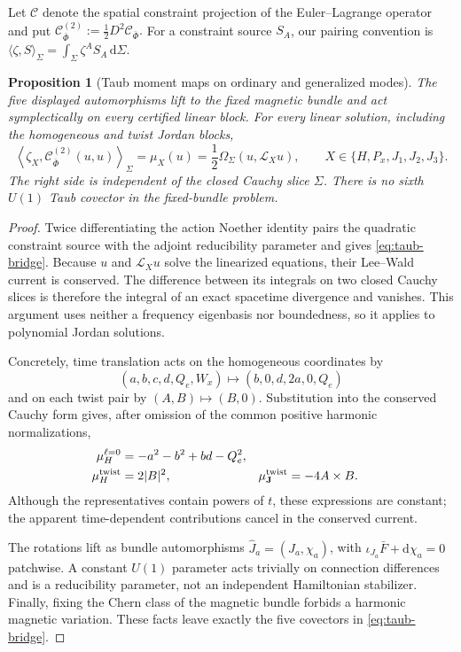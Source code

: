 \documentclass[11pt]{article}
\newtheorem{proposition}[theorem]{Proposition}
\theoremstyle{definition}
\theoremstyle{remark}
\newcommand{\dd}{\mathrm d}
\newcommand{\cC}{\mathcal C}
\begin{document}
Let \(\cC\) denote the spatial constraint projection of the Euler--Lagrange
operator and put
\(
 \cC^{(2)}_{\bar\Phi}:=\tfrac12D^2\cC_{\bar\Phi}.
\)
For a constraint source \(S_A\), our pairing convention is
\(
 \langle\zeta,S\rangle_\Sigma
 =\int_\Sigma\zeta^A S_A\,\dd\Sigma.
\)

\begin{proposition}[Taub moment maps on ordinary and generalized modes]
\label{prop:generalized-taub}
The five displayed automorphisms lift to the fixed magnetic bundle and act
symplectically on every certified linear block.  For every linear solution,
including the homogeneous and twist Jordan blocks,
\begin{equation}\label{eq:taub-bridge}
 \left\langle\zeta_X,
 \cC^{(2)}_{\bar\Phi}(u,u)\right\rangle_\Sigma
 =\mu_X(u)
 =\frac12\Omega_\Sigma(u,\mathcal L_Xu),
 \qquad X\in\{H,P_x,J_1,J_2,J_3\}.
\end{equation}
The right side is independent of the closed Cauchy slice \(\Sigma\).
There is no sixth \(U(1)\) Taub covector in the fixed-bundle problem.
\end{proposition}

\begin{proof}
Twice differentiating the action Noether identity pairs the quadratic
constraint source with the adjoint reducibility parameter and gives
\eqref{eq:taub-bridge}.  Because \(u\) and \(\mathcal L_Xu\) solve the
linearized equations, their Lee--Wald current is conserved.  The difference
between its integrals on two closed Cauchy slices is therefore the integral
of an exact spacetime divergence and vanishes.  This argument uses neither a
frequency eigenbasis nor boundedness, so it applies to polynomial Jordan
solutions.

Concretely, time translation acts on the homogeneous coordinates by
\[
 (a,b,c,d,Q_e,W_x)\longmapsto(b,0,d,2a,0,Q_e)
\]
and on each twist pair by \((A,B)\mapsto(B,0)\).  Substitution into the
conserved Cauchy form gives, after omission of the common positive harmonic
normalizations,
\begin{align}
 \mu_H^{\ell=0}&=-a^2-b^2+bd-Q_e^2,\\
 \mu_H^{\rm twist}&=2|B|^2,
 &\mu_{\mathbf J}^{\rm twist}&=-4A\times B.
\end{align}
Although the representatives contain powers of \(t\), these expressions are
constant; the apparent time-dependent contributions cancel in the conserved
current.

The rotations lift as bundle automorphisms
\(\widehat J_a=(J_a,\chi_a)\), with
\(\iota_{J_a}\bar F+\dd\chi_a=0\) patchwise.  A constant \(U(1)\) parameter
acts trivially on connection differences and is a reducibility parameter,
not an independent Hamiltonian stabilizer.  Finally, fixing the Chern class
of the magnetic bundle forbids a harmonic magnetic variation.  These facts
leave exactly the five covectors in \eqref{eq:taub-bridge}.
\end{proof}
\end{document}
